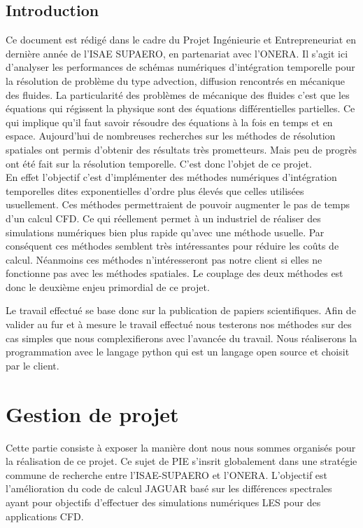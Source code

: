 \documentclass[a4paper,12pt]{report}
\theoremstyle{break}
\begin{document}
\chapter*{Introduction}
Ce document est rédigé dans le cadre du Projet Ingénieurie et Entrepreneuriat en dernière année de l'ISAE SUPAERO, en partenariat avec l'ONERA. Il s'agit ici d'analyser les performances de schémas numériques d’intégration
temporelle pour la résolution de problème du type advection, diffusion rencontrés en mécanique des fluides. La particularité des problèmes de mécanique des fluides c'est que les équations qui régissent la physique sont des équations différentielles partielles. Ce qui implique qu'il faut savoir résoudre des équations à la fois en temps et en espace. Aujourd'hui de nombreuses recherches sur les méthodes de résolution spatiales ont permis d'obtenir des résultats très prometteurs. Mais peu de progrès ont été fait sur la résolution temporelle. C'est donc l'objet de ce projet. \\

En effet l'objectif c'est d'implémenter des méthodes numériques d'intégration temporelles dites \og exponentielles \fg{} d'ordre plus élevés que celles utilisées usuellement.  Ces méthodes permettraient de pouvoir augmenter le pas de temps d'un calcul CFD. Ce qui réellement permet à un industriel de réaliser des simulations numériques bien plus rapide qu'avec une méthode usuelle. Par conséquent ces méthodes semblent très intéressantes pour réduire les coûts de calcul. 
Néanmoins ces méthodes n'intéresseront pas notre client si elles ne fonctionne pas avec les méthodes spatiales. Le couplage des deux méthodes est donc le deuxième enjeu primordial de ce projet. 

Le travail effectué se base donc sur la publication de papiers scientifiques. Afin de valider au fur et à mesure le travail effectué nous testerons nos méthodes sur des cas simples que nous complexifierons avec l'avancée du travail. Nous réaliserons la programmation avec le langage python qui est un langage open source et choisit par le client. 

\part{Gestion de projet}

\vfill

Cette partie consiste à exposer la manière dont nous nous sommes organisés pour la réalisation de ce projet. Ce sujet de PIE s'insrit globalement dans une stratégie commune de recherche entre l'ISAE-SUPAERO et l'ONERA. L'objectif est l'amélioration du code de calcul JAGUAR basé sur les différences spectrales ayant pour objectifs d'effectuer des simulations numériques LES pour des applications CFD.
\end{document}
